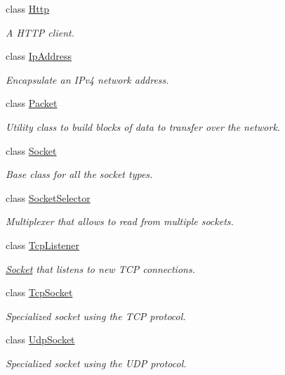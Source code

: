 \begin{DoxyCompactItemize}
class \hyperlink{classsf_1_1_http}{Http}
\begin{DoxyCompactList}\small\item\em A H\-T\-T\-P client. \end{DoxyCompactList}\item 
class \hyperlink{classsf_1_1_ip_address}{Ip\-Address}
\begin{DoxyCompactList}\small\item\em Encapsulate an I\-Pv4 network address. \end{DoxyCompactList}\item 
class \hyperlink{classsf_1_1_packet}{Packet}
\begin{DoxyCompactList}\small\item\em Utility class to build blocks of data to transfer over the network. \end{DoxyCompactList}\item 
class \hyperlink{classsf_1_1_socket}{Socket}
\begin{DoxyCompactList}\small\item\em Base class for all the socket types. \end{DoxyCompactList}\item 
class \hyperlink{classsf_1_1_socket_selector}{Socket\-Selector}
\begin{DoxyCompactList}\small\item\em Multiplexer that allows to read from multiple sockets. \end{DoxyCompactList}\item 
class \hyperlink{classsf_1_1_tcp_listener}{Tcp\-Listener}
\begin{DoxyCompactList}\small\item\em \hyperlink{classsf_1_1_socket}{Socket} that listens to new T\-C\-P connections. \end{DoxyCompactList}\item 
class \hyperlink{classsf_1_1_tcp_socket}{Tcp\-Socket}
\begin{DoxyCompactList}\small\item\em Specialized socket using the T\-C\-P protocol. \end{DoxyCompactList}\item 
class \hyperlink{classsf_1_1_udp_socket}{Udp\-Socket}
\begin{DoxyCompactList}\small\item\em Specialized socket using the U\-D\-P protocol. \end{DoxyCompactList}\item 

\end{DoxyCompactItemize}
